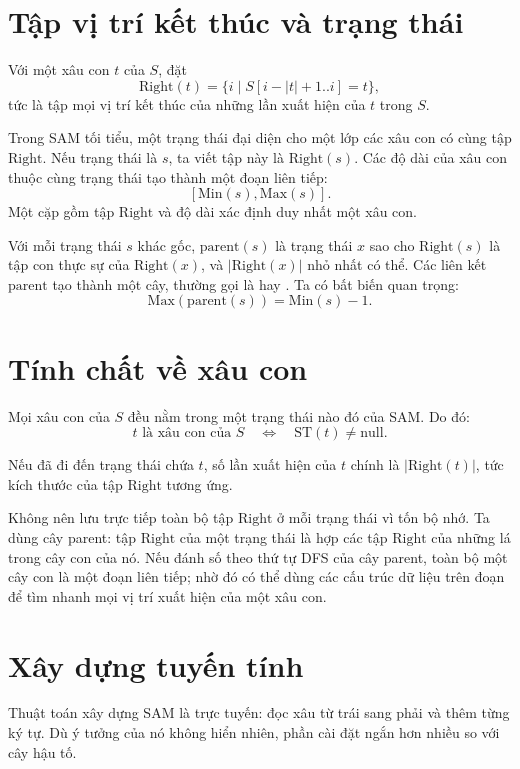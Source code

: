 \documentclass[11pt]{article}
\begin{document}
\section{Tập vị trí kết thúc và trạng thái}

Với một xâu con $t$ của $S$, đặt
\[
  \mathrm{Right}(t)=\{i \mid S[i-|t|+1..i]=t\},
\]
tức là tập mọi vị trí kết thúc của những lần xuất hiện của $t$ trong $S$.

Trong SAM tối tiểu, một trạng thái đại diện cho một lớp các xâu con có cùng tập
$\mathrm{Right}$.  Nếu trạng thái là $s$, ta viết tập này là
$\mathrm{Right}(s)$.  Các độ dài của xâu con thuộc cùng trạng thái tạo thành
một đoạn liên tiếp:
\[
  [\mathrm{Min}(s),\mathrm{Max}(s)].
\]
Một cặp gồm tập $\mathrm{Right}$ và độ dài xác định duy nhất một xâu con.

Với mỗi trạng thái $s$ khác gốc, $\mathrm{parent}(s)$ là trạng thái $x$ sao cho
$\mathrm{Right}(s)$ là tập con thực sự của $\mathrm{Right}(x)$, và
$|\mathrm{Right}(x)|$ nhỏ nhất có thể.  Các liên kết $\mathrm{parent}$ tạo thành
một cây, thường gọi là  hay .  Ta có bất
biến quan trọng:
\[
  \mathrm{Max}(\mathrm{parent}(s))=\mathrm{Min}(s)-1.
\]

\section{Tính chất về xâu con}

Mọi xâu con của $S$ đều nằm trong một trạng thái nào đó của SAM.  Do đó:
\[
  t \text{ là xâu con của } S
  \quad\Longleftrightarrow\quad
  \mathrm{ST}(t)\ne \mathrm{null}.
\]

Nếu đã đi đến trạng thái chứa $t$, số lần xuất hiện của $t$ chính là
$|\mathrm{Right}(t)|$, tức kích thước của tập $\mathrm{Right}$ tương ứng.

Không nên lưu trực tiếp toàn bộ tập $\mathrm{Right}$ ở mỗi trạng thái vì tốn bộ
nhớ.  Ta dùng cây parent: tập $\mathrm{Right}$ của một trạng thái là hợp các tập
$\mathrm{Right}$ của những lá trong cây con của nó.  Nếu đánh số theo thứ tự DFS
của cây parent, toàn bộ một cây con là một đoạn liên tiếp; nhờ đó có thể dùng
các cấu trúc dữ liệu trên đoạn để tìm nhanh mọi vị trí xuất hiện của một xâu
con.

\section{Xây dựng tuyến tính}

Thuật toán xây dựng SAM là trực tuyến: đọc xâu từ trái sang phải và thêm từng ký
tự.  Dù ý tưởng của nó không hiển nhiên, phần cài đặt ngắn hơn nhiều so với cây
hậu tố.
\end{document}

